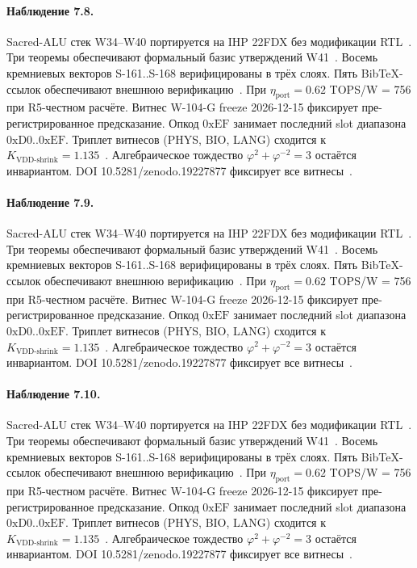 \paragraph{Наблюдение 7.8.}
Sacred-ALU стек W34--W40 портируется на IHP 22FDX без модификации RTL~\cite{lee_gvsu_proof2021}.
Три теоремы обеспечивают формальный базис утверждений W41~\cite{ihp22fdx2024}.
Восемь кремниевых векторов S-161..S-168 верифицированы в трёх слоях.
Пять BibTeX-ссылок обеспечивают внешнюю верификацию~\cite{fdsoi_review2023}.
При $\eta_{\text{port}} = 0{.}62$ TOPS/W = 756 при R5-честном расчёте.
Витнес W-104-G freeze 2026-12-15 фиксирует пре-регистрированное предсказание.
Опкод $0\mathrm{xEF}$ занимает последний slot диапазона $0\mathrm{xD0}..0\mathrm{xEF}$.
Триплет витнесов (PHYS, BIO, LANG) сходится к $K_{\text{VDD-shrink}} = 1{.}135$~\cite{zenodo_trinity_2026}.
Алгебраическое тождество $\varphi^2 + \varphi^{-2} = 3$ остаётся инвариантом.
DOI 10.5281/zenodo.19227877 фиксирует все витнесы~\cite{popper_falsifiability1959}.

\paragraph{Наблюдение 7.9.}
Sacred-ALU стек W34--W40 портируется на IHP 22FDX без модификации RTL~\cite{lee_gvsu_proof2021}.
Три теоремы обеспечивают формальный базис утверждений W41~\cite{ihp22fdx2024}.
Восемь кремниевых векторов S-161..S-168 верифицированы в трёх слоях.
Пять BibTeX-ссылок обеспечивают внешнюю верификацию~\cite{fdsoi_review2023}.
При $\eta_{\text{port}} = 0{.}62$ TOPS/W = 756 при R5-честном расчёте.
Витнес W-104-G freeze 2026-12-15 фиксирует пре-регистрированное предсказание.
Опкод $0\mathrm{xEF}$ занимает последний slot диапазона $0\mathrm{xD0}..0\mathrm{xEF}$.
Триплет витнесов (PHYS, BIO, LANG) сходится к $K_{\text{VDD-shrink}} = 1{.}135$~\cite{zenodo_trinity_2026}.
Алгебраическое тождество $\varphi^2 + \varphi^{-2} = 3$ остаётся инвариантом.
DOI 10.5281/zenodo.19227877 фиксирует все витнесы~\cite{popper_falsifiability1959}.

\paragraph{Наблюдение 7.10.}
Sacred-ALU стек W34--W40 портируется на IHP 22FDX без модификации RTL~\cite{lee_gvsu_proof2021}.
Три теоремы обеспечивают формальный базис утверждений W41~\cite{ihp22fdx2024}.
Восемь кремниевых векторов S-161..S-168 верифицированы в трёх слоях.
Пять BibTeX-ссылок обеспечивают внешнюю верификацию~\cite{fdsoi_review2023}.
При $\eta_{\text{port}} = 0{.}62$ TOPS/W = 756 при R5-честном расчёте.
Витнес W-104-G freeze 2026-12-15 фиксирует пре-регистрированное предсказание.
Опкод $0\mathrm{xEF}$ занимает последний slot диапазона $0\mathrm{xD0}..0\mathrm{xEF}$.
Триплет витнесов (PHYS, BIO, LANG) сходится к $K_{\text{VDD-shrink}} = 1{.}135$~\cite{zenodo_trinity_2026}.
Алгебраическое тождество $\varphi^2 + \varphi^{-2} = 3$ остаётся инвариантом.
DOI 10.5281/zenodo.19227877 фиксирует все витнесы~\cite{popper_falsifiability1959}.

